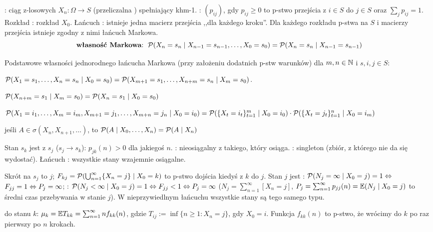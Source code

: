 : ciąg  z-losowych $X_n \colon \Omega \to S$ (przeliczalna ) spełniający khm-1.
: $(p_{ij})$, gdy $p_{ij}\ge 0$ to p-stwo przejścia z $i \in S$ do $j \in S$ oraz $\sum_j p_{ij} = 1$.
Rozkład : rozkład $X_0$.
Łańcuch : istnieje jedna macierz przejścia ,,dla każdego kroku''.
Dla każdego rozkładu p-stwa na $S$ i macierzy przejścia istnieje zgodny z nimi łańcuch Markowa.
\[
	\textrm{{\bf {własność Markowa}}: } \operatorname{\mathcal{P}} (X_n = s_n \mid X_{n-1} = s_{n-1}, \dots, X_0 = s_0) = \operatorname{\mathcal{P}} (X_n = s_n \mid X_{n-1} = s_{n-1})
\]

Podstawowe własności jednorodnego łańcucha Markowa (przy założeniu dodatnich p-stw warunków) dla $m, n \in \mathbb N$ i $s, i, j \in S$:
\begin{enumx}
	\item $\operatorname{\mathcal{P}} (X_1 = s_1, \ldots, X_n = s_n \mid X_0 = s_0) = \operatorname{\mathcal{P}} (X_{m+1} = s_1, \ldots, X_{n+m} = s_n \mid X_m = s_0)$.
	\item $\operatorname{\mathcal{P}} (X_{n+m} = s_1 \mid X_m = s_0) = \operatorname{\mathcal{P}} (X_n = s_1 \mid X_0 = s_0)$
	\item $\operatorname{\mathcal{P}} (X_1 = i_1, \ldots, X_m = i_m, X_{m+1} = j_1, \ldots, X_{m+n} = j_n \mid X_0 = i_0) = \operatorname{\mathcal{P}} (\{X_t = i_t\}_{t=1}^m \mid X_0 = i_0) \cdot \operatorname{\mathcal{P}} (\{X_t = j_t\}_{t=1}^n \mid X_0 = i_m)$
	\item jeśli $A \in \sigma (X_n, X_{n+1}, \ldots)$, to $\operatorname{\mathcal{P}} (A \mid X_0, \ldots, X_n) = \operatorname{\mathcal{P}} (A \mid X_n)$
\end{enumx}

Stan  $s_k$ jest  z $s_j$ ($s_j \to s_k$): $p_{jk}(n) > 0$ dla jakiegoś $n$.
: nieosiągalny z takiego, który osiąga.
: singleton  (zbiór, z którego nie da się wydostać).
Łańcuch : wszystkie stany wzajemnie osiągalne.

Skrót  na $s_j$ to $j$; $F_{kj} = \operatorname{\mathcal{P}} (\bigcup_{n=1}^\infty \{X_n = j\} \mid X_0 = k)$ to p-stwo dojścia kiedyś z $k$ do $j$.
Stan $j$ jest : $\operatorname{\mathcal{P}} (N_j = \infty \mid X_0 = j) = 1 \Leftrightarrow$ $F_{jj} = 1 \Leftrightarrow P_j = \infty$; : $\operatorname{\mathcal{P}}(N_j < \infty \mid X_0 = j) = 1 \Leftrightarrow F_{jj} < 1 \Leftrightarrow P_j = \infty$ ($N_j = \sum_{n=1}^\infty [X_n = j]$, $P_j = \sum_{n=1}^\infty p_{jj}(n) = \mathbb{E} (N_j \mid X_0 = j)$ to średni czas przebywania w stanie $j$).
W nieprzywiedlnym łańcuchu wszystkie stany są tego samego typu.

 do stanu $k$: $\mu_k = \mathbb{E} T_{kk} = \sum_{n=1}^\infty n f_{kk}(n)$, gdzie $T_{ij} := \inf \{n \ge 1 : X_n = j\}$, gdy $X_0 = i$.
Funkcja $f_{kk}(n)$ to p-stwo, że wrócimy do $k$ po raz pierwszy po $n$ krokach.

